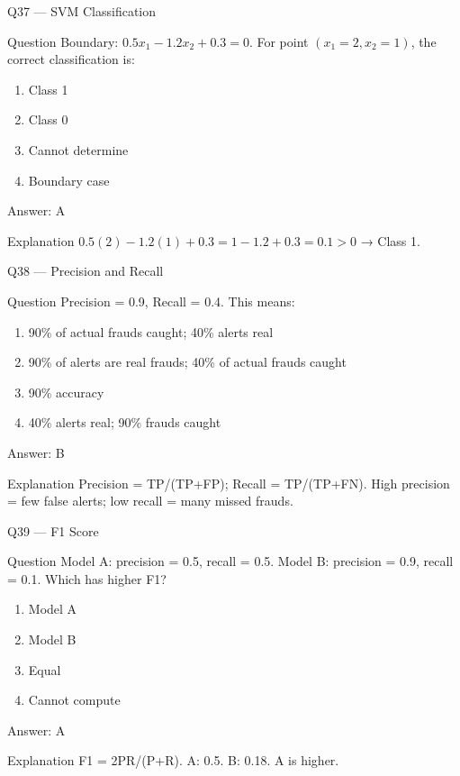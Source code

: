 \documentclass[aspectratio=169,8pt]{beamer}
\begin{document}
	\begin{frame}{Q37 --- SVM Classification}
		\begin{block}{Question}
			Boundary: $0.5x_1 - 1.2x_2 + 0.3 = 0$. For point $(x_1=2, x_2=1)$, the correct classification is:
		\end{block}
		\begin{enumerate}
			\item Class 1
			\item Class 0
			\item Cannot determine
			\item Boundary case
		\end{enumerate}
		\begin{exampleblock}{Answer: A}\end{exampleblock}
		\begin{block}{Explanation}
			$0.5(2) - 1.2(1) + 0.3 = 1 - 1.2 + 0.3 = 0.1 > 0$ → Class 1.
		\end{block}
	\end{frame}
	
	\begin{frame}{Q38 --- Precision and Recall}
		\begin{block}{Question}
			Precision = 0.9, Recall = 0.4. This means:
		\end{block}
		\begin{enumerate}
			\item 90\% of actual frauds caught; 40\% alerts real
			\item 90\% of alerts are real frauds; 40\% of actual frauds caught
			\item 90\% accuracy
			\item 40\% alerts real; 90\% frauds caught
		\end{enumerate}
		\begin{exampleblock}{Answer: B}\end{exampleblock}
		\begin{block}{Explanation}
			Precision = TP/(TP+FP); Recall = TP/(TP+FN). High precision = few false alerts; low recall = many missed frauds.
		\end{block}
	\end{frame}
	
	\begin{frame}{Q39 --- F1 Score}
		\begin{block}{Question}
			Model A: precision = 0.5, recall = 0.5. Model B: precision = 0.9, recall = 0.1. Which has higher F1?
		\end{block}
		\begin{enumerate}
			\item Model A
			\item Model B
			\item Equal
			\item Cannot compute
		\end{enumerate}
		\begin{exampleblock}{Answer: A}\end{exampleblock}
		\begin{block}{Explanation}
			F1 = 2PR/(P+R). A: 0.5. B: 0.18. A is higher.
		\end{block}
	\end{frame}
	
\end{document}
